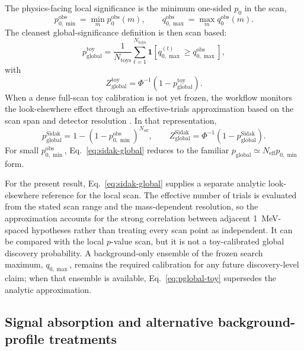 The physics-facing local significance is the minimum one-sided $p_0$ in the scan,
\begin{equation}
p_{0,\min}^{\mathrm{obs}} = \min_m p_0^{\mathrm{obs}}(m),
\qquad
q_{0,\max}^{\mathrm{obs}} = \max_m q_0^{\mathrm{obs}}(m).
\end{equation}
The cleanest global-significance definition is then scan based:
\begin{equation}
p_{\mathrm{global}}^{\mathrm{toy}}
=
\frac{1}{N_{\mathrm{toys}}}
\sum_{t=1}^{N_{\mathrm{toys}}}
\mathbf{1}\!\left[
q_{0,\max}^{(t)} \ge q_{0,\max}^{\mathrm{obs}}
\right],
\label{eq:pglobal-toy}
\end{equation}
with
\begin{equation}
Z_{\mathrm{global}}^{\mathrm{toy}} = \Phi^{-1}\!\left(1-p_{\mathrm{global}}^{\mathrm{toy}}\right).
\end{equation}
When a dense full-scan toy calibration is not yet frozen, the workflow monitors the
look-elsewhere effect through an effective-trials approximation based on the scan span
and detector resolution \cite{GrossVitells2010}. In that representation,
\begin{equation}
p_{\mathrm{global}}^{\mathrm{Sidak}}
=
1-\left(1-p_{0,\min}^{\mathrm{obs}}\right)^{N_{\mathrm{eff}}},
\qquad
Z_{\mathrm{global}}^{\mathrm{Sidak}}
=
\Phi^{-1}\!\left(1-p_{\mathrm{global}}^{\mathrm{Sidak}}\right).
\label{eq:sidak-global}
\end{equation}
For small $p_{0,\min}^{\mathrm{obs}}$, Eq.~\eqref{eq:sidak-global} reduces to the
familiar $p_{\mathrm{global}}\simeq N_{\mathrm{eff}}p_{0,\min}$ form.

For the present result, Eq.~\eqref{eq:sidak-global} supplies a separate analytic
look-elsewhere reference for the local scan. The effective number of trials is
evaluated from the stated scan range and the mass-dependent resolution, so the
approximation accounts for the strong correlation between adjacent
\SI{1}{MeV}-spaced hypotheses rather than treating every scan point as independent.
It can be compared with the local $p$-value scan, but it is not a toy-calibrated global
discovery probability. A background-only ensemble of
the frozen search maximum, $q_{0,\max}$, remains the required calibration for any
future discovery-level claim; when that ensemble is available,
Eq.~\eqref{eq:pglobal-toy} supersedes the analytic approximation.

\subsection{Signal absorption and alternative background-profile treatments}

